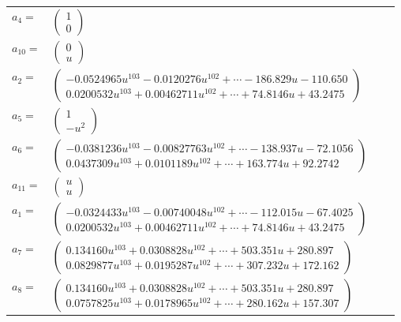 \documentclass[1p]{elsarticle_modified}
\theoremstyle{definition}
\begin{document}
\begin{tabular}{m{7pt} m{180pt} m{7pt} m{180pt} }
\flushright $a_{4}=$&$\begin{pmatrix}1\\0\end{pmatrix}$ \\
\flushright $a_{10}=$&$\begin{pmatrix}0\\u\end{pmatrix}$ \\
\flushright $a_{2}=$&$\begin{pmatrix}-0.0524965 u^{103}-0.0120276 u^{102}+\cdots-186.829 u-110.650\\0.0200532 u^{103}+0.00462711 u^{102}+\cdots+74.8146 u+43.2475\end{pmatrix}$ \\
\flushright $a_{5}=$&$\begin{pmatrix}1\\- u^2\end{pmatrix}$ \\
\flushright $a_{6}=$&$\begin{pmatrix}-0.0381236 u^{103}-0.00827763 u^{102}+\cdots-138.937 u-72.1056\\0.0437309 u^{103}+0.0101189 u^{102}+\cdots+163.774 u+92.2742\end{pmatrix}$ \\
\flushright $a_{11}=$&$\begin{pmatrix}u\\u\end{pmatrix}$ \\
\flushright $a_{1}=$&$\begin{pmatrix}-0.0324433 u^{103}-0.00740048 u^{102}+\cdots-112.015 u-67.4025\\0.0200532 u^{103}+0.00462711 u^{102}+\cdots+74.8146 u+43.2475\end{pmatrix}$ \\
\flushright $a_{7}=$&$\begin{pmatrix}0.134160 u^{103}+0.0308828 u^{102}+\cdots+503.351 u+280.897\\0.0829877 u^{103}+0.0195287 u^{102}+\cdots+307.232 u+172.162\end{pmatrix}$ \\
\flushright $a_{8}=$&$\begin{pmatrix}0.134160 u^{103}+0.0308828 u^{102}+\cdots+503.351 u+280.897\\0.0757825 u^{103}+0.0178965 u^{102}+\cdots+280.162 u+157.307\end{pmatrix}$ \\

\end{tabular}
\end{document}
